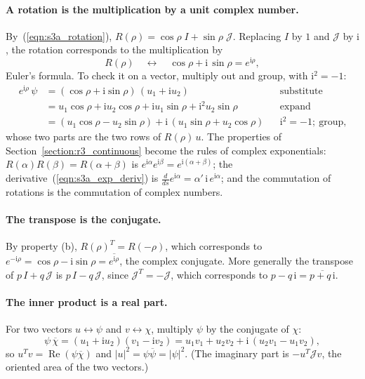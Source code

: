 \paragraph{A rotation is the multiplication by a unit complex number.} By~(\ref{eqn:s3a_rotation}), $R(\rho) = \cos\rho\; I + \sin\rho\;\mathcal J$. Replacing $I$ by $1$ and $\mathcal J$ by $\mathrm i$, the rotation corresponds to the multiplication by
\begin{equation}
\label{eqn:int_matrix_rotation}
R(\rho) \quad\longleftrightarrow\quad \cos\rho + \mathrm i\,\sin\rho = e^{\mathrm i\rho} ,
\end{equation}
Euler's formula. To check it on a vector, multiply out and group, with $\mathrm i^2 = -1$:
\begin{align*}
e^{\mathrm i\rho}\,\psi &= (\cos\rho + \mathrm i\sin\rho)\,(u_1 + \mathrm i u_2) && \text{substitute} \\
&= u_1\cos\rho + \mathrm i u_2\cos\rho + \mathrm i u_1\sin\rho + \mathrm i^2 u_2\sin\rho && \text{expand} \\
&= (u_1\cos\rho - u_2\sin\rho) + \mathrm i\,(u_1\sin\rho + u_2\cos\rho) && \mathrm i^2 = -1;\ \text{group,}
\end{align*}
whose two parts are the two rows of $R(\rho)\,u$. The properties of Section~\ref{section:r3_continuous} become the rules of complex exponentials: $R(\alpha)R(\beta) = R(\alpha + \beta)$ is $e^{\mathrm i\alpha}e^{\mathrm i\beta} = e^{\mathrm i(\alpha + \beta)}$; the derivative~(\ref{eqn:s3a_exp_deriv}) is $\frac{d}{ds}e^{\mathrm i\alpha} = \alpha'\,\mathrm i\, e^{\mathrm i\alpha}$; and the commutation of rotations is the commutation of complex numbers.

\paragraph{The transpose is the conjugate.} By property (b), $R(\rho)^T = R(-\rho)$, which corresponds to $e^{-\mathrm i\rho} = \cos\rho - \mathrm i\sin\rho = \overline{e^{\mathrm i\rho}}$, the complex conjugate. More generally the transpose of $p\,I + q\,\mathcal J$ is $p\,I - q\,\mathcal J$, since $\mathcal J^T = -\mathcal J$, which corresponds to $p - q\,\mathrm i = \overline{p + q\,\mathrm i}$.

\paragraph{The inner product is a real part.} For two vectors $u \leftrightarrow \psi$ and $v \leftrightarrow \chi$, multiply $\psi$ by the conjugate of $\chi$:
\begin{equation*}
\psi\,\overline\chi = (u_1 + \mathrm i u_2)(v_1 - \mathrm i v_2) = u_1v_1 + u_2v_2 + \mathrm i\,(u_2v_1 - u_1v_2) ,
\end{equation*}
so $u^Tv = \operatorname{Re}(\psi\overline\chi)$ and $|u|^2 = \psi\overline\psi = |\psi|^2$. (The imaginary part is $-u^T\mathcal Jv$, the oriented area of the two vectors.)

